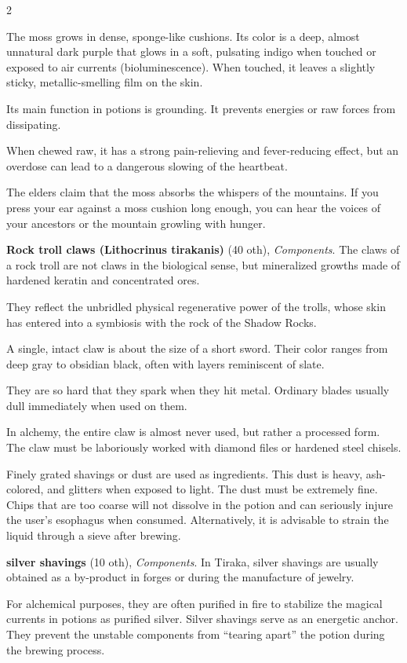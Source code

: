 \begin{multicols}{2}
\begin{denseitemize}
The moss grows in dense, sponge-like cushions. Its color is a deep, almost unnatural dark purple that glows in a soft, pulsating indigo when touched or exposed to air currents (bioluminescence).
When touched, it leaves a slightly sticky, metallic-smelling film on the skin.

Its main function in potions is grounding. It prevents energies or raw forces from dissipating.

When chewed raw, it has a strong pain-relieving and fever-reducing effect, but an overdose can lead to a dangerous slowing of the heartbeat.

The elders claim that the moss absorbs the whispers of the mountains. If you press your ear against a moss cushion long enough, you can hear the voices of your ancestors or the mountain growling with hunger.
        \item \textbf{Rock troll claws (Lithocrinus tirakanis)} (40 oth), \textit{Components}.
        The claws of a rock troll are not claws in the biological sense, but mineralized growths made of hardened keratin and concentrated ores.

They reflect the unbridled physical regenerative power of the trolls, whose skin has entered into a symbiosis with the rock of the Shadow Rocks.

A single, intact claw is about the size of a short sword.
Their color ranges from deep gray to obsidian black, often with layers reminiscent of slate.

They are so hard that they spark when they hit metal. Ordinary blades usually dull immediately when used on them.

In alchemy, the entire claw is almost never used, but rather a processed form. The claw must be laboriously worked with diamond files or hardened steel chisels. 

Finely grated shavings or dust are used as ingredients. This dust is heavy, ash-colored, and glitters when exposed to light.
The dust must be extremely fine. Chips that are too coarse will not dissolve in the potion and can seriously injure the user's esophagus when consumed. Alternatively, it is advisable to strain the liquid through a sieve after brewing.
        \item \textbf{silver shavings} (10 oth), \textit{Components}.
        In Tiraka, silver shavings are usually obtained as a by-product in forges or during the manufacture of jewelry.

For alchemical purposes, they are often purified in fire to stabilize the magical currents in potions as purified silver.
Silver shavings serve as an energetic anchor. They prevent the unstable components from “tearing apart” the potion during the brewing process.
    \end{denseitemize}



\end{multicols}
